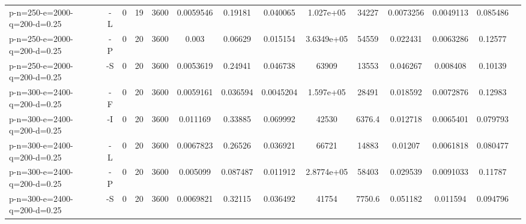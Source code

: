 \documentclass[landscape, a4paper]{article}
\begin{document}
\begin{center}
\begin{tabular}{lccccccccccccc}
p-n=250-e=2000-q=200-d=0.25 & -L & 0 & 19 & 3600 & 0.0059546 & 0.19181 & 0.040065 & 1.027e+05 & 34227 & 0.0073256 & 0.0049113 & 0.085486 & \\
p-n=250-e=2000-q=200-d=0.25 & -P & 0 & 20 & 3600 & 0.003 & 0.06629 & 0.015154 & 3.6349e+05 & 54559 & 0.022431 & 0.0063286 & 0.12577 & \\
p-n=250-e=2000-q=200-d=0.25 & -S & 0 & 20 & 3600 & 0.0053619 & 0.24941 & 0.046738 & 63909 & 13553 & 0.046267 & 0.008408 & 0.10139 & \\
p-n=300-e=2400-q=200-d=0.25 & -F & 0 & 20 & 3600 & 0.0059161 & 0.036594 & 0.0045204 & 1.597e+05 & 28491 & 0.018592 & 0.0072876 & 0.12983 & \\
p-n=300-e=2400-q=200-d=0.25 & -I & 0 & 20 & 3600 & 0.011169 & 0.33885 & 0.069992 & 42530 & 6376.4 & 0.012718 & 0.0065401 & 0.079793 & \\
p-n=300-e=2400-q=200-d=0.25 & -L & 0 & 20 & 3600 & 0.0067823 & 0.26526 & 0.036921 & 66721 & 14883 & 0.01207 & 0.0061818 & 0.080477 & \\
p-n=300-e=2400-q=200-d=0.25 & -P & 0 & 20 & 3600 & 0.005099 & 0.087487 & 0.011912 & 2.8774e+05 & 58403 & 0.029539 & 0.0091033 & 0.11787 & \\
p-n=300-e=2400-q=200-d=0.25 & -S & 0 & 20 & 3600 & 0.0069821 & 0.32115 & 0.036492 & 41754 & 7750.6 & 0.051182 & 0.011594 & 0.094796 & \\
\end{tabular}
\end{center}
\end{document}
